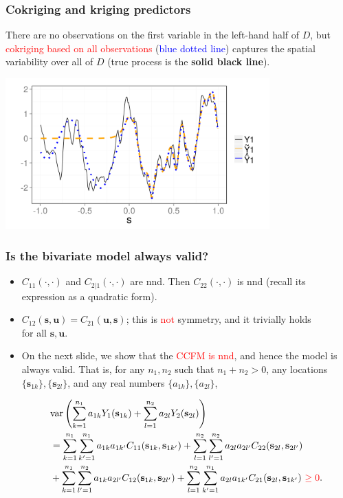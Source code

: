 \documentclass{beamer}
\newcommand{\svec} {\textbf{s}}
\newcommand{\uvec} {\textbf{u}}
\newcommand{\s}{\mathbf{s}}
\renewcommand{\u}{\mathbf{u}}
\newcommand{\var}{\mathrm{var}}
\begin{document}
\begin{frame}
\frametitle{Cokriging and kriging predictors}
There are no observations on the first variable in the left-hand half of $D$, but \textcolor{red}{cokriging based on all observations} (\textcolor{blue}{blue dotted line}) captures the spatial variability over all of $D$ (true process is the \textbf{solid black line}).
\vspace{-.5cm}
\begin{center}
\includegraphics[width=4in]{./sim_est.png}
\end{center}
\end{frame}


\begin{frame}
\frametitle{Is the bivariate model always valid?}

\begin{itemize}
\item $C_{11}(\cdot,\cdot)$ and $C_{2|1}(\cdot,\cdot)$ are nnd. Then $C_{22}(\cdot,\cdot)$ is nnd (recall its expression as a quadratic form).
\item $C_{12}(\svec,\uvec) = C_{21}(\uvec,\svec)$; this is \textcolor{red}{not} symmetry, and it trivially holds \\for all $\s,\u$.
\item On the next slide, we show that the \textcolor{red}{CCFM is nnd}, and hence the model is always valid. That is, for any $n_1,n_2$ such that $n_1 + n_2 > 0$, any locations $\{\svec_{1k}\}, \{\svec_{2l}\}$, and any real numbers $\{a_{1k}\},\{a_{2l}\}$,

\small
\begin{align*}
 & \var\left(\sum_{k=1}^{n_1}{a_{1k}Y_1(\s_{1k})}+\sum_{l=1}^{n_2}{a_{2l}Y_2(\s_{2l})}\right) \\ &=\sum_{k=1}^{n_1}\sum_{k'=1}^{n_1} a_{1k}a_{1k'}C_{11}(\s_{1k},\s_{1k'})+\sum_{l=1}^{n_2}\sum_{l'=1}^{n_2} a_{2l}a_{2l'}C_{22}(\s_{2l},\s_{2l'}) \\
  &+\sum_{k=1}^{n_1}\sum_{l'=1}^{n_2} a_{1k}a_{2l'}C_{12}(\s_{1k},\s_{2l'})+\sum_{l=1}^{n_2}\sum_{k'=1}^{n_1} a_{2l}a_{1k'}C_{21}(\s_{2l},\s_{1k'})~ \textcolor{red}{\ge 0}.
\end{align*}

\normalsize
\end{itemize}
\end{frame}
\end{document}
